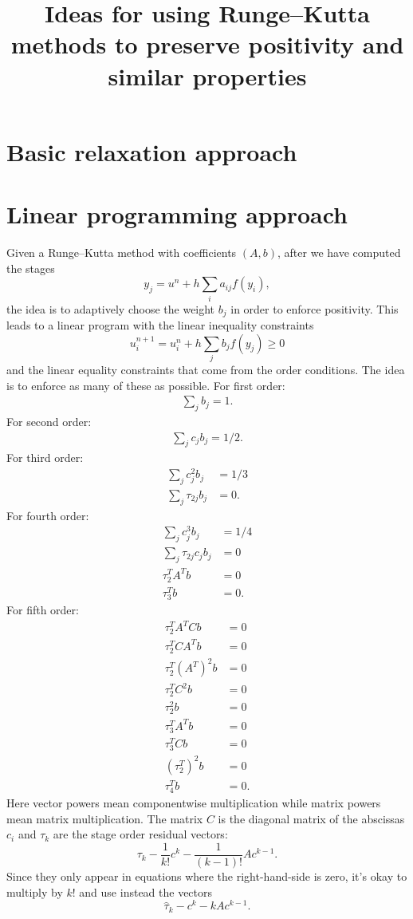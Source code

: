 \documentclass{article}
\title{Ideas for using Runge--Kutta methods to preserve positivity and similar properties}
\begin{document}
\maketitle

\section{Basic relaxation approach}

\section{Linear programming approach}
Given a Runge--Kutta method with coefficients $(A,b)$, after we have computed
the stages
$$
    y_j = u^n + h \sum_i a_{ij} f(y_i),
$$
the idea is to adaptively choose the weight $b_j$ in order to enforce positivity.
This leads to a linear program with the linear inequality constraints
$$
u^{n+1}_i = u^n_i + h \sum_j b_j f(y_j) \ge 0
$$
and the linear equality constraints that come from the order conditions.  The idea is
to enforce as many of these as possible.  For first order:
\begin{align}
\sum_j b_j = 1.
\end{align}
For second order:
\begin{align}
\sum_j c_j b_j = 1/2.
\end{align}
For third order:
\begin{align}
\sum_j c_j^2 b_j & = 1/3 \\
\sum_j \tau_{2j} b_j & = 0.
\end{align}
For fourth order:
\begin{align}
\sum_j c_j^3 b_j & = 1/4 \\
\sum_j \tau_{2j} c_j b_j & = 0 \\
\tau_{2}^T A^T b & = 0 \\
\tau_{3}^T b & = 0.
\end{align}
For fifth order:
\begin{align}
\tau_2^T A^T C b & = 0 \\
\tau_2^T C A^T b & = 0 \\
\tau_2^T (A^T)^2 b & = 0 \\
\tau_2^T C^2 b & = 0 \\
\tau_2^2 b & = 0 \\
\tau_3^T A^T b & = 0 \\
\tau_3^T C b & = 0 \\
(\tau_2^T)^2 b & = 0 \\
\tau_4^T b & = 0.
\end{align}
Here vector powers mean componentwise multiplication while
matrix powers mean matrix multiplication.  The matrix $C$ is the
diagonal matrix of the abscissas $c_i$ and
$\tau_k$ are the stage order residual vectors:
$$
    \tau_k - \frac{1}{k!} c^k - \frac{1}{(k-1)!}Ac^{k-1}.
$$
Since they only appear in equations where the right-hand-side is zero,
it's okay to multiply by $k!$ and use instead the vectors
$$
    \hat{\tau}_k - c^k - kAc^{k-1}.
$$
\end{document}
